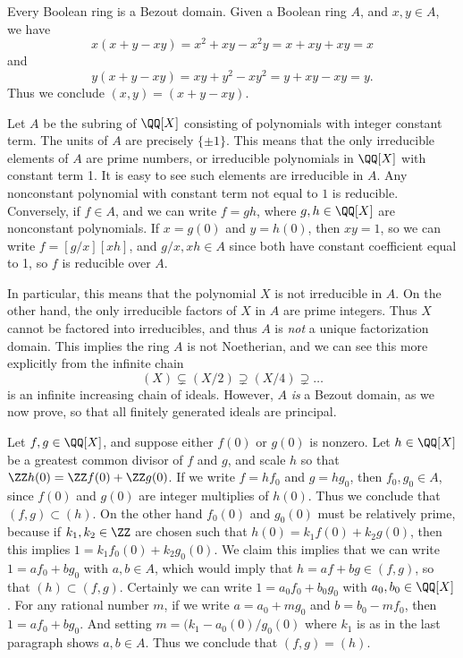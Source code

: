 \begin{example}
    Every Boolean ring is a Bezout domain. Given a Boolean ring $A$, and $x,y \in A$, we have
    \[ x(x + y - xy) = x^2 + xy - x^2y = x + xy + xy = x \]
    and
    \[ y(x  +y - xy) = xy + y^2 - xy^2 = y + xy - xy = y. \]
    Thus we conclude $(x,y) = (x + y - xy)$.
\end{example}

\begin{example}
    Let $A$ be the subring of $\QQ[X]$ consisting of polynomials with integer constant term. The units of $A$ are precisely $\{ \pm 1 \}$. This means that the only irreducible elements of $A$ are prime numbers, or irreducible polynomials in $\QQ[X]$ with constant term 1. It is easy to see such elements are irreducible in $A$. Any nonconstant polynomial with constant term not equal to $1$ is reducible. Conversely, if $f \in A$, and we can write $f = gh$, where $g,h \in \QQ[X]$ are nonconstant polynomials. If $x = g(0)$ and $y = h(0)$, then $xy = 1$, so we can write $f = [g/x][xh]$, and $g/x,xh \in A$ since both have constant coefficient equal to 1, so $f$ is reducible over $A$.

    In particular, this means that the polynomial $X$ is not irreducible in $A$. On the other hand, the only irreducible factors of $X$ in $A$ are prime integers. Thus $X$ cannot be factored into irreducibles, and thus $A$ is \emph{not} a unique factorization domain. This implies the ring $A$ is not Noetherian, and we can see this more explicitly from the infinite chain
    \[ (X) \subsetneq (X/2) \supsetneq (X/4) \supsetneq \dots \]
    is an infinite increasing chain of ideals. However, $A$ \emph{is} a Bezout domain, as we now prove, so that all finitely generated ideals are principal.

    Let $f,g \in \QQ[X]$, and suppose either $f(0)$ or $g(0)$ is nonzero. Let $h \in \QQ[X]$ be a greatest common divisor of $f$ and $g$, and scale $h$ so that $\ZZ h(0) = \ZZ f(0) + \ZZ g(0)$. If we write $f = hf_0$ and $g = hg_0$, then $f_0, g_0 \in A$, since $f(0)$ and $g(0)$ are integer multiplies of $h(0)$. Thus we conclude that $(f,g) \subset (h)$. On the other hand $f_0(0)$ and $g_0(0)$ must be relatively prime, because if $k_1,k_2 \in \ZZ$ are chosen such that $h(0) = k_1 f(0) + k_2g(0)$, then this implies $1 = k_1 f_0(0) + k_2 g_0(0)$. We claim this implies that we can write $1 = a f_0 + b g_0$ with $a,b \in A$, which would imply that $h = af + bg \in (f,g)$, so that $(h) \subset (f,g)$. Certainly we can write $1 = a_0 f_0 + b_0 g_0$ with $a_0,b_0 \in \QQ[X]$. For any rational number $m$, if we write $a = a_0 + mg_0$ and $b = b_0 - mf_0$, then $1 = af_0 + bg_0$. And setting $m = (k_1 - a_0(0) / g_0(0)$ where $k_1$ is as in the last paragraph shows $a,b \in A$. Thus we conclude that $(f,g) = (h)$.


\end{example}
